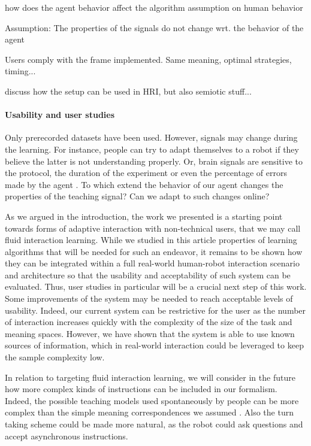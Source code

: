how does the agent behavior affect the algorithm assumption on human behavior

Assumption: The properties of the signals do not change wrt. the behavior of the agent

Users comply with the frame implemented. Same meaning, optimal strategies, timing...

discuss how the setup can be used in HRI, but also semiotic stuff...

\paragraph{Usability and user studies}

Only prerecorded datasets have been used. However, signals may change during the learning. For instance, people can try to adapt themselves to a robot if they believe the latter is not understanding properly. Or, brain signals are sensitive to the protocol, the duration of the experiment or even the percentage of errors made by the agent \cite{chavarriaga2010learning}. To which extend the behavior of our agent changes the properties of the teaching signal? Can we adapt to such changes online? 

As we argued in the introduction, the work we presented is a starting point towards forms of adaptive interaction with non-technical users, that we may call fluid interaction learning. While we studied in this article properties of learning algorithms that will be needed for such an endeavor, it remains to be shown how they can be integrated within a full real-world human-robot interaction scenario and architecture so that the usability and acceptability of such system can be evaluated. Thus, user studies in particular will be a crucial next step of this work. Some improvements of the system may be needed to reach acceptable levels of usability.
Indeed, our current system can be restrictive for the user as the number of interaction increases quickly with the complexity of the size of the task and meaning spaces. However, we have shown that the system is able to use known sources of information, which in real-world interaction could be leveraged to keep the sample complexity low.

In relation to targeting fluid interaction learning, we will consider in the future how more complex kinds of instructions can be included in our formalism. Indeed, the possible teaching models used spontaneously by people can be more complex than the simple meaning correspondences we assumed \cite{thomaz2008teachable,Cakmak2010optimality}. Also the turn taking scheme could be made more natural, as the robot could ask questions \cite{cakmak2012designing} and accept asynchronous instructions.


